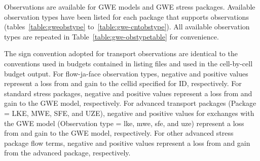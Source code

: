 Observations are available for GWE models and GWE stress packages. Available observation types have been listed for each package that supports observations (tables~\ref{table:gweobstype} to~\ref{table:gwe-cntobstype}). All available observation types are repeated in Table~\ref{table:gwe-obstypetable} for convenience. 

The sign convention adopted for transport observations are identical to the conventions used in budgets contained in listing files and used in the cell-by-cell budget output. For flow-ja-face observation types, negative and positive values represent a loss from and gain to the cellid specified for ID, respectively. For standard stress packages, negative and positive values represent a loss from and gain to the GWE model, respectively. For advanced transport packages (Package = LKE, MWE, SFE, and UZE), negative and positive values for exchanges with the GWE model (Observation type = lke, mwe, sfe, and uze) represent a loss from and gain to the GWE model, respectively. For other advanced stress package flow terms, negative and positive values represent a loss from and gain from the advanced package, respectively.

\FloatBarrier

\FloatBarrier

